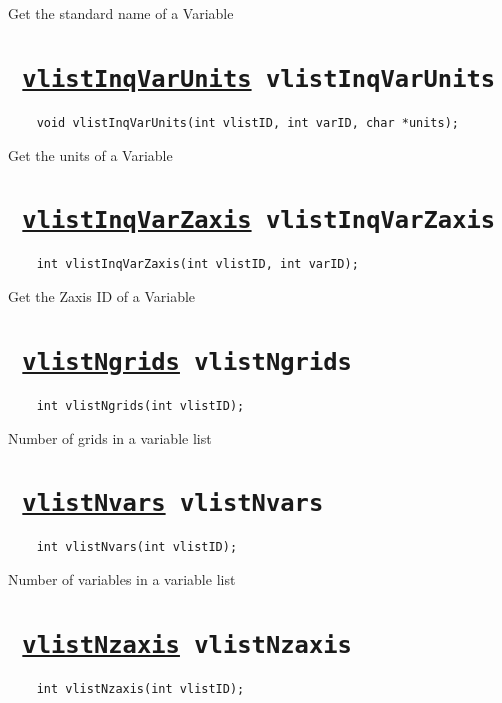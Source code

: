 Get the standard name of a Variable
\ifpdfoutput{}{(\ref{vlistInqVarStdname})}


\section*{\tt 
\ifpdf
\hyperref[vlistInqVarUnits]{vlistInqVarUnits}
\else
vlistInqVarUnits
\fi
}
\begin{verbatim}
    void vlistInqVarUnits(int vlistID, int varID, char *units);
\end{verbatim}

Get the units of a Variable
\ifpdfoutput{}{(\ref{vlistInqVarUnits})}


\section*{\tt 
\ifpdf
\hyperref[vlistInqVarZaxis]{vlistInqVarZaxis}
\else
vlistInqVarZaxis
\fi
}
\begin{verbatim}
    int vlistInqVarZaxis(int vlistID, int varID);
\end{verbatim}

Get the Zaxis ID of a Variable
\ifpdfoutput{}{(\ref{vlistInqVarZaxis})}


\section*{\tt 
\ifpdf
\hyperref[vlistNgrids]{vlistNgrids}
\else
vlistNgrids
\fi
}
\begin{verbatim}
    int vlistNgrids(int vlistID);
\end{verbatim}

Number of grids in a variable list
\ifpdfoutput{}{(\ref{vlistNgrids})}


\section*{\tt 
\ifpdf
\hyperref[vlistNvars]{vlistNvars}
\else
vlistNvars
\fi
}
\begin{verbatim}
    int vlistNvars(int vlistID);
\end{verbatim}

Number of variables in a variable list
\ifpdfoutput{}{(\ref{vlistNvars})}


\section*{\tt 
\ifpdf
\hyperref[vlistNzaxis]{vlistNzaxis}
\else
vlistNzaxis
\fi
}
\begin{verbatim}
    int vlistNzaxis(int vlistID);
\end{verbatim}

